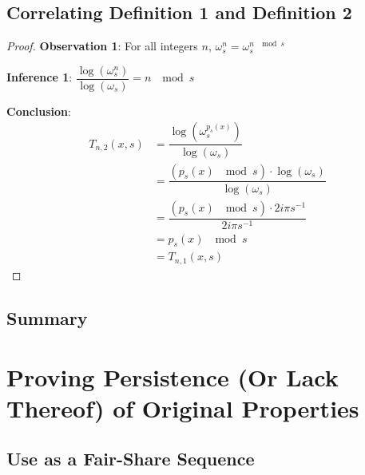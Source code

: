 \documentclass[conference]{IEEEtran}
\begin{document}
\subsection{Correlating Definition 1 and Definition 2}

\begin{proof}
\par\noindent\par
    \textbf{Observation 1}: For all integers $n$, $\omega_s^n = \omega_s^{n \; \mod{s}}$

    \textbf{Inference 1}: $\dfrac{\log(\omega_s^n)}{\log(\omega_s)} = n \; \mod{s}$

    \textbf{Conclusion}: \begin{equation}
        \begin{aligned}
            T_{n,2}(x, s) &= \dfrac{\log(\omega_s^{p_s(x)})}{\log(\omega_s)} \\
                          &= \dfrac{(p_s(x) \; \mod{s}) \cdot \log(\omega_s)}{\log(\omega_s)} \\
                          &= \dfrac{(p_s(x) \; \mod{s}) \cdot 2i\pi s^{-1}}{2i\pi s^{-1}} \\
                          &= p_s(x) \; \mod{s} \\
                          &= T_{n,1}(x, s)
        \end{aligned}
    \end{equation}
\end{proof}

\subsection{Summary}

\section{Proving Persistence (Or Lack Thereof) of Original Properties}

\subsection{Use as a Fair-Share Sequence}

\end{document}
